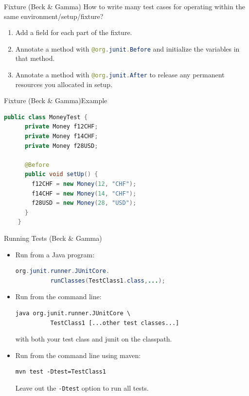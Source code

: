 \begin{Frame}{Fixture (Beck \& Gamma)}
  How to write many test cases for operating within the same
    environment/setup/\alert{fixture}?
  \begin{enumerate}
    \item Add a field for each part of the fixture.
    \item Annotate a method with \lstinline[language=java]-@org.junit.Before- and initialize the variables in that method.
    \item Annotate a method with \lstinline[language=java]-@org.junit.After- to release any permanent resources you allocated in setup.
  \end{enumerate}
\end{Frame}

\begin{Frame}[fragile]{Fixture (Beck \& Gamma)}{Example}
  \begin{lstlisting}[language=java,gobble=4]
    public class MoneyTest { 
      private Money f12CHF; 
      private Money f14CHF; 
      private Money f28USD; 
    
      @Before
      public void setUp() { 
        f12CHF = new Money(12, "CHF"); 
        f14CHF = new Money(14, "CHF"); 
        f28USD = new Money(28, "USD"); 
      }
    }
  \end{lstlisting}
\end{Frame}

\begin{Frame}[fragile]{Running Tests (Beck \& Gamma)}
  \begin{itemize}
    \item Run from a Java program:
      \begin{lstlisting}[language=java,gobble=8]
        org.junit.runner.JUnitCore.
          runClasses(TestClass1.class,...);
      \end{lstlisting}
    \item Run from the command line:
      \begin{lstlisting}[language={},gobble=8]
        java org.junit.runner.JUnitCore \
          TestClass1 [...other test classes...]
      \end{lstlisting}
      with both your test class and junit on the classpath.
    \item Run from the command line using maven:
      \begin{lstlisting}[language={},gobble=8]
        mvn test -Dtest=TestClass1
      \end{lstlisting}
      Leave out the \lstinline[language={}]=-Dtest= option to run all tests.
  \end{itemize}
\end{Frame}

